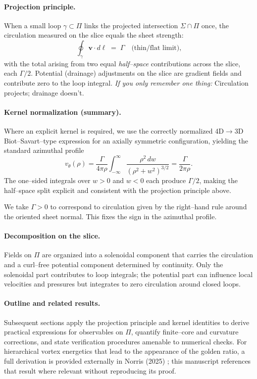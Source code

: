 \paragraph{Projection principle.}
When a small loop $\gamma\subset\Pi$ links the projected intersection $\Sigma\cap\Pi$ once, the circulation measured on the slice equals the sheet strength:
\[
\oint_{\gamma} \mathbf{v}\cdot d\boldsymbol{\ell}\;=\;\Gamma
\quad\text{(thin/flat limit),}
\]
with the total arising from two equal \emph{half–space} contributions across the slice, each $\Gamma/2$. Potential (drainage) adjustments on the slice are gradient fields and contribute zero to the loop integral. \textit{If you only remember one thing:} Circulation projects; drainage doesn't.

\paragraph{Kernel normalization (summary).}
Where an explicit kernel is required, we use the correctly normalized 4D$\to$3D Biot–Savart–type expression for an axially symmetric configuration, yielding the standard azimuthal profile
\[
v_\theta(\rho)
=\frac{\Gamma}{4\pi\rho}\!\int_{-\infty}^{\infty}\frac{\rho^2\,dw}{(\rho^2+w^2)^{3/2}}
=\frac{\Gamma}{2\pi\rho}.
\]
The one–sided integrals over $w>0$ and $w<0$ each produce $\Gamma/2$, making the half–space split explicit and consistent with the projection principle above.

\begin{physbox}[title=Orientation note]
We take $\Gamma>0$ to correspond to circulation given by the right–hand rule around the oriented sheet normal. This fixes the sign in the azimuthal profile.
\end{physbox}

\paragraph{Decomposition on the slice.}
Fields on $\Pi$ are organized into a solenoidal component that carries the circulation and a curl–free potential component determined by continuity. Only the solenoidal part contributes to loop integrals; the potential part can influence local velocities and pressures but integrates to zero circulation around closed loops.

\paragraph{Outline and related results.}
Subsequent sections apply the projection principle and kernel identities to derive practical expressions for observables on $\Pi$, quantify finite–core and curvature corrections, and state verification procedures amenable to numerical checks. For hierarchical vortex energetics that lead to the appearance of the golden ratio, a full derivation is provided externally in Norris (2025) \cite{Norris2025GoldenRatio}; this manuscript references that result where relevant without reproducing its proof.

